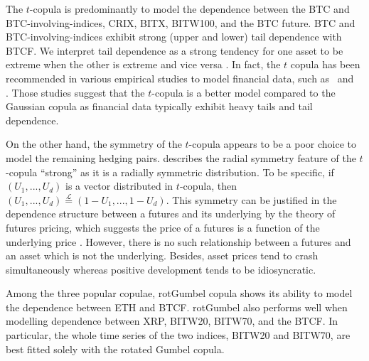 The $t$-copula is predominantly to model the dependence between 
the BTC and BTC-involving-indices, CRIX, BITX, BITW100, and the BTC
future.
BTC and BTC-involving-indices exhibit strong (upper and lower) tail
dependence with BTCF.  We interpret tail dependence as a strong
tendency for one asset to be extreme when the other is extreme and
vice versa \citep{McNeil2015}.
In fact, the $t$ copula has been recommended in various empirical
studies to model financial data, such as~\cite{zeevi2002beyond} and~
\cite{breymann2003dependence}.
Those studies suggest that the $t$-copula is a better model compared
to the Gaussian copula as financial data typically exhibit heavy tails
and tail dependence. 

On the other hand, the  symmetry of the
$t$-copula appears to be a poor choice to model the remaining hedging
pairs. 
\cite{demarta2005t} describes the radial symmetry feature of the $t$-copula ``strong'' as it is a radially symmetric distribution.
To be specific, if $(U_1, ..., U_d)$ is a vector distributed in $t$-copula,
then $(U_1, ..., U_d) \overset{\mathcal{L}}= (1-U_1, ...,
1-U_d)$.
This symmetry can be justified in the dependence structure between a
futures and its underlying by the theory of futures pricing,
which suggests the price of a futures is a function of the underlying
price \citep{hull2003options}. However, there is no such relationship
between a futures and an asset which is not the underlying. Besides,
asset prices tend to crash simultaneously whereas positive development
tends to be idiosyncratic.   

Among the three popular copulae, rotGumbel copula shows its ability to
model the dependence between ETH and BTCF. rotGumbel also performs
well when modelling dependence between XRP, BITW20, BITW70, and the
BTCF. In particular, the whole time series of the two indices, BITW20
and BITW70, are best fitted solely with the rotated Gumbel
copula.

